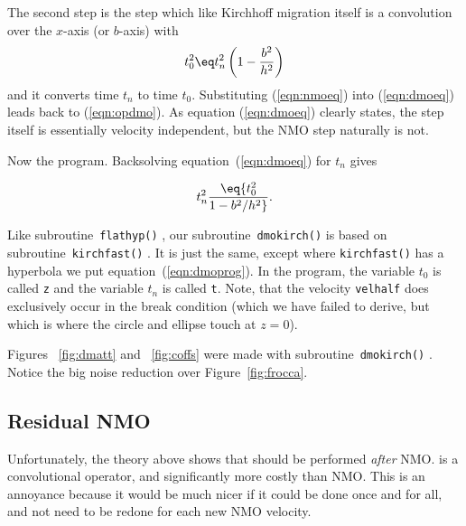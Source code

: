 The second step is the  step which
like Kirchhoff migration itself
is a convolution over the $x$-axis (or $b$-axis) with
\begin{equation}
	\label{eqn:dmoeq}
	t_0^2 \eq t_n^2 \left( 1 - {b^2 \over h^2} \right)
\end{equation}
and it converts time $t_n$ to time $t_0$.
Substituting (\ref{eqn:nmoeq}) into (\ref{eqn:dmoeq}) leads back to (\ref{eqn:opdmo}).
As equation (\ref{eqn:dmoeq}) clearly states,
the  step itself is essentially velocity independent, 
but the NMO step naturally is not. 

Now the program.
Backsolving equation~(\ref{eqn:dmoeq}) for $t_n$ gives

\begin{equation}
        \label{eqn:dmoprog}
	t_n^2 \eq
	{t_0^2 \over 1-b^2/h^2 } .
\end{equation}

Like subroutine~\texttt{flathyp()} ,
our  subroutine~\texttt{dmokirch()}  is based on
subroutine~\texttt{kirchfast()} .
It is just the same,
except where {\tt kirchfast()} has a hyperbola
we put equation~(\ref{eqn:dmoprog}).
In the program,
    the variable $t_0$ is called {\tt z}
and the variable $t_n$ is called {\tt t}.
Note, that the velocity {\tt velhalf} does exclusively
occur in the break condition
(which we have failed to derive,
but which is where the circle and ellipse touch at $z=0$).

Figures ~\ref{fig:dmatt} and ~\ref{fig:coffs}
were made with subroutine~\texttt{dmokirch()} . 
Notice the big noise reduction over Figure~\ref{fig:frocca}.
\newslide
{}
\newslide

\subsection{Residual NMO}
Unfortunately, the theory above shows
that  should be performed {\em  after} NMO.
 is a convolutional operator,
and significantly more costly than NMO.
This is an annoyance because it would
be much nicer if it could be done
once and for all, and not need to be redone for each new NMO velocity.

